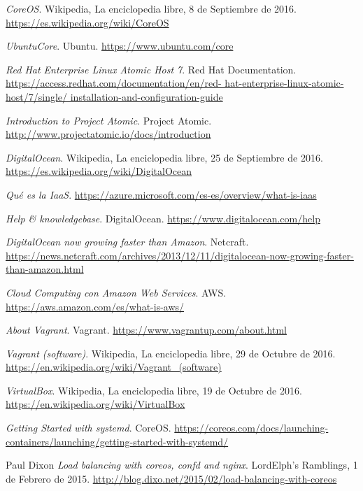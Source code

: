 \begin{thebibliography}{9}
\textit{CoreOS}. 
Wikipedia, La enciclopedia libre, 8 de Septiembre de 2016.
\url{https://es.wikipedia.org/wiki/CoreOS}

\textit{UbuntuCore}. 
Ubuntu.
\url{https://www.ubuntu.com/core}

\textit{Red Hat Enterprise Linux Atomic Host 7}. 
Red Hat Documentation.
\url{https://access.redhat.com/documentation/en/red-
hat-enterprise-linux-atomic-host/7/single/
installation-and-configuration-guide}

\textit{Introduction to Project Atomic}. 
Project Atomic.
\url{http://www.projectatomic.io/docs/introduction}

\textit{DigitalOcean}. 
Wikipedia, La enciclopedia libre, 25 de Septiembre de 2016.
\url{https://es.wikipedia.org/wiki/DigitalOcean}

\textit{Qué es la IaaS}.
\url{https://azure.microsoft.com/es-es/overview/what-is-iaas}

\textit{Help \& knowledgebase}. 
DigitalOcean.
\url{https://www.digitalocean.com/help}

\textit{DigitalOcean now growing faster than Amazon}. 
Netcraft.
\url{https://news.netcraft.com/archives/2013/12/11/digitalocean-now-growing-faster-than-amazon.html}

\textit{Cloud Computing con Amazon Web Services}. 
AWS.
\url{https://aws.amazon.com/es/what-is-aws/}

\textit{About Vagrant}. 
Vagrant.
\url{https://www.vagrantup.com/about.html}

\textit{Vagrant (software)}. 
Wikipedia, La enciclopedia libre, 29 de Octubre de 2016.
\url{https://en.wikipedia.org/wiki/Vagrant\_(software)}

\textit{VirtualBox}. 
Wikipedia, La enciclopedia libre, 19 de Octubre de 2016.
\url{https://en.wikipedia.org/wiki/VirtualBox}

\textit{Getting Started with systemd}. 
CoreOS.
\url{https://coreos.com/docs/launching-containers/launching/getting-started-with-systemd/}

Paul Dixon
\textit{Load balancing with coreos, confd and nginx}. 
LordElph's Ramblings, 1 de Febrero de 2015.
\url{http://blog.dixo.net/2015/02/load-balancing-with-coreos}


\end{thebibliography}
